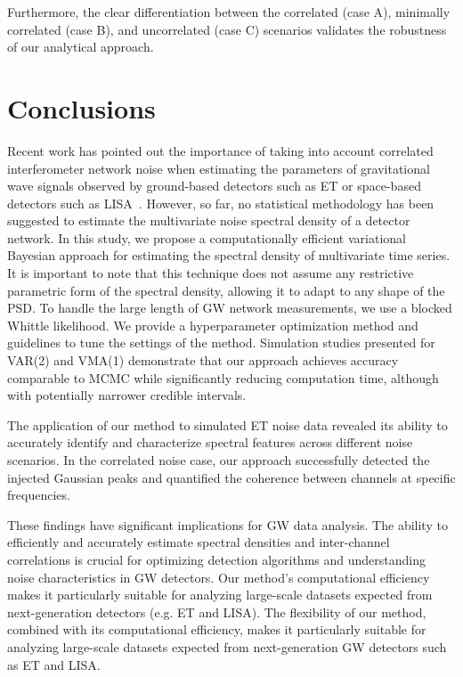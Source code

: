 \documentclass[%
 reprint,
 amsmath,amssymb,
 aps,
 nofootinbib,
]{revtex4-2}
\begin{document}
Furthermore, the clear differentiation between the correlated (case A), minimally correlated (case B), and uncorrelated (case C) scenarios validates the robustness of our analytical approach.

\section{Conclusions}
\label{sec:Discussion}
Recent work has pointed out the importance of taking into account correlated interferometer network noise when estimating the parameters of gravitational wave signals observed by ground-based detectors such as ET or space-based detectors such as LISA~\cite{x,y,z}. 
However, so far, no statistical methodology has been suggested to estimate the multivariate noise spectral density of a detector network.
In this study, we propose a computationally efficient variational Bayesian approach for estimating the spectral density of multivariate time series. 
It is important to note that this technique does not assume any restrictive parametric form of the spectral density, allowing it to adapt to any shape of the PSD.
To handle the large length of GW network measurements, we use a blocked Whittle likelihood. 
We provide a hyperparameter optimization method and guidelines to tune the settings of the method. 
Simulation studies presented for VAR(2) and VMA(1) demonstrate that our approach achieves accuracy comparable to MCMC while significantly reducing computation time, although with potentially narrower credible intervals.

The application of our method to simulated ET noise data revealed its ability to accurately identify and characterize spectral features across different noise scenarios.
In the correlated noise case, our approach successfully detected the injected Gaussian peaks and quantified the coherence between channels at specific frequencies. 


These findings have significant implications for GW data analysis. The ability to efficiently and accurately estimate spectral densities and inter-channel correlations is crucial for optimizing detection algorithms and understanding noise characteristics in GW detectors. Our method's computational efficiency makes it particularly suitable for analyzing large-scale datasets expected from next-generation detectors (e.g. ET and LISA). The flexibility of our method, combined with its computational efficiency, makes it particularly suitable for analyzing large-scale datasets expected from next-generation GW detectors such as ET and LISA.
\end{document}
